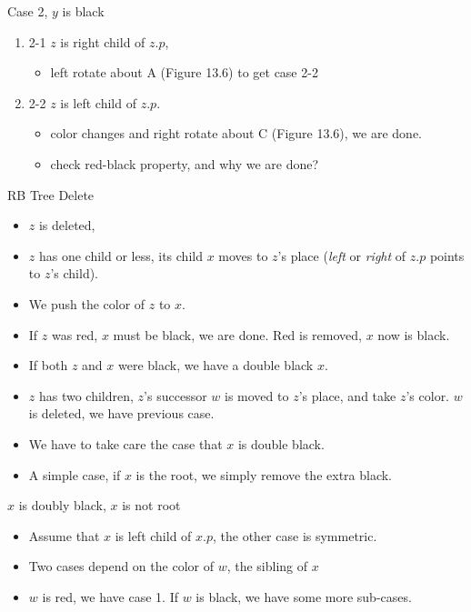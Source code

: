 \documentclass{beamer}
\begin{document}
\begin{frame}{Case 2, $y$ is black}

\begin{enumerate}
\item 2-1 $z$ is right child of $z.p$,
\begin{itemize}
\item left rotate about A (Figure 13.6) to get case 2-2
\end{itemize}
\item 2-2 $z$ is left child of $z.p$. 
\begin{itemize}
\item color changes and right rotate about C (Figure 13.6), we are done. 
\item check red-black property, and why we are done?
\end{itemize}

\end{enumerate}
\end{frame}

\begin{frame}{RB Tree Delete}

\begin{itemize}
\item $z$ is deleted, 
\item $z$ has one child or less, its child $x$ moves to $z$'s place ({\it left} or {\it right} of $z.p$ points to $z$'s child). 
\item We push the color of $z$ to $x$. 
\item If $z$ was red, $x$ must be black, we are done. Red is removed, $x$ now is black. 
\item  If both $z$ and $x$ were black, we have a double black $x$. 
\item $z$ has two children, $z$'s successor $w$ is moved to $z$'s place, and take $z$'s color.  $w$ is deleted, we have previous case. 
\item We have to take care the case that $x$ is double black. 
\item A simple case, if $x$ is the root, we simply remove the extra black. 
\end{itemize}
\end{frame}

\begin{frame}{$x$ is doubly black, $x$ is not root}

\begin{itemize}
\item Assume that $x$ is left child of $x.p$, the other case is symmetric. 
\item Two cases depend on the color of $w$, the sibling of $x$
\item $w$ is red, we have case 1. If $w$ is black, we have some more sub-cases. 
\end{itemize}
\end{frame}
\end{document}
